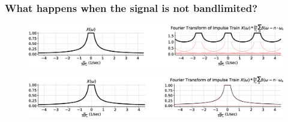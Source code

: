 \documentclass[aspectratio=169]{beamer}
\begin{document}
\begin{frame}[t]
  \frametitle{What happens when the signal is not bandlimited?}
  \begin{figure}
  \centering
  \includegraphics[width=1\textwidth, left]{img/sampling-nbl.eps}
  \end{figure}

  \begin{figure}
  \centering
  \includegraphics[width=1\textwidth, left]{img/sampling-nbl-high.eps}
  \end{figure}
\end{frame}
\end{document}
